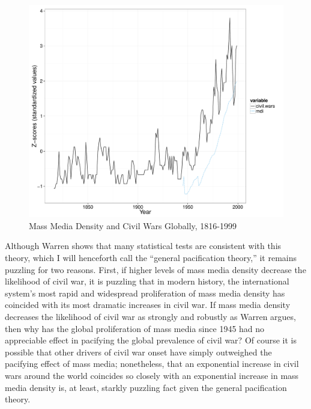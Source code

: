 \documentclass[11pt,article,oneside]{memoir}
\makeatletter
\def\maxwidth{\ifdim\Gin@nat@width>\linewidth\linewidth
\else\Gin@nat@width\fi}
\let\Oldincludegraphics\includegraphics
\renewcommand{\includegraphics}[1]{\Oldincludegraphics[width=\maxwidth]{#1}}
\makeatother
\begin{document}
\begin{figure}[htbp]
\centering
\includegraphics{./media_civil_war_files/figure-markdown/globalplot.pdf}
\caption{Mass Media Density and Civil Wars Globally, 1816-1999}
\end{figure}

Although Warren shows that many statistical tests are consistent with
this theory, which I will henceforth call the ``general pacification
theory,'' it remains puzzling for two reasons. First, if higher levels
of mass media density decrease the likelihood of civil war, it is
puzzling that in modern history, the international system's most rapid
and widespread proliferation of mass media density has coincided with
its most dramatic increases in civil war. If mass media density
decreases the likelihood of civil war as strongly and robustly as Warren
argues, then why has the global proliferation of mass media since 1945
had no appreciable effect in pacifying the global prevalence of civil
war? Of course it is possible that other drivers of civil war onset have
simply outweighed the pacifying effect of mass media; nonetheless, that
an exponential increase in civil wars around the world coincides so
closely with an exponential increase in mass media density is, at least,
starkly puzzling fact given the general pacification theory.
\end{document}
